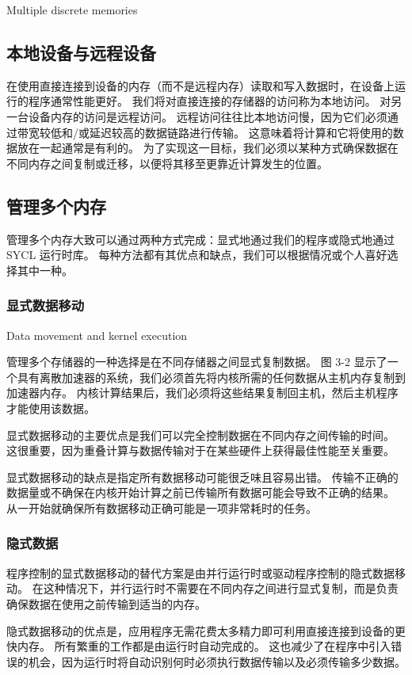 {\color{red} Multiple discrete memories }

\subsection{本地设备与远程设备}
在使用直接连接到设备的内存（而不是远程内存）读取和写入数据时，在设备上运行的程序通常性能更好。 
我们将对直接连接的存储器的访问称为本地访问。 对另一台设备内存的访问是远程访问。 
远程访问往往比本地访问慢，因为它们必须通过带宽较低和/或延迟较高的数据链路进行传输。 
这意味着将计算和它将使用的数据放在一起通常是有利的。 
为了实现这一目标，我们必须以某种方式确保数据在不同内存之间复制或迁移，以便将其移至更靠近计算发生的位置。

\subsection{管理多个内存}
管理多个内存大致可以通过两种方式完成：显式地通过我们的程序或隐式地通过 SYCL 运行时库。 
每种方法都有其优点和缺点，我们可以根据情况或个人喜好选择其中一种。

\subsubsection{显式数据移动}
{\color{red} Data movement and kernel execution }

管理多个存储器的一种选择是在不同存储器之间显式复制数据。 
图 3-2 显示了一个具有离散加速器的系统，我们必须首先将内核所需的任何数据从主机内存复制到加速器内存。 
内核计算结果后，我们必须将这些结果复制回主机，然后主机程序才能使用该数据。

显式数据移动的主要优点是我们可以完全控制数据在不同内存之间传输的时间。 
这很重要，因为重叠计算与数据传输对于在某些硬件上获得最佳性能至关重要。

显式数据移动的缺点是指定所有数据移动可能很乏味且容易出错。 
传输不正确的数据量或不确保在内核开始计算之前已传输所有数据可能会导致不正确的结果。 
从一开始就确保所有数据移动正确可能是一项非常耗时的任务。

\subsubsection{隐式数据}
程序控制的显式数据移动的替代方案是由并行运行时或驱动程序控制的隐式数据移动。 
在这种情况下，并行运行时不需要在不同内存之间进行显式复制，而是负责确保数据在使用之前传输到适当的内存。

隐式数据移动的优点是，应用程序无需花费太多精力即可利用直接连接到设备的更快内存。 
所有繁重的工作都是由运行时自动完成的。 
这也减少了在程序中引入错误的机会，因为运行时将自动识别何时必须执行数据传输以及必须传输多少数据。


